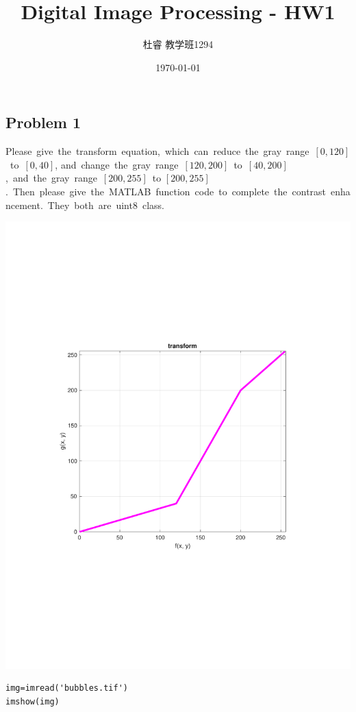 \documentclass{article}
\title{Digital Image Processing - HW1}
\author{杜睿 教学班1294}
\date{\today}
\begin{document}
\begin{CJK}{UTF8}{gbsn}
\maketitle{}

\section{Problem 1}

Please give the transform equation, which can reduce the gray range $[0, 120]$ to $[0, 40]$,
and change the gray range $[120, 200]$ to $[40, 200]$, and the gray range $[200, 255]$ to $[200, 255]$. Then please give the MATLAB function code to complete the contrast enhancement. They both are uint8 class.

{\centering
\includegraphics[width=1\textwidth]{transform.pdf}}

\begin{lstlisting}
img=imread('bubbles.tif')
imshow(img)


\end{lstlisting}
\end{CJK}
\end{document}
